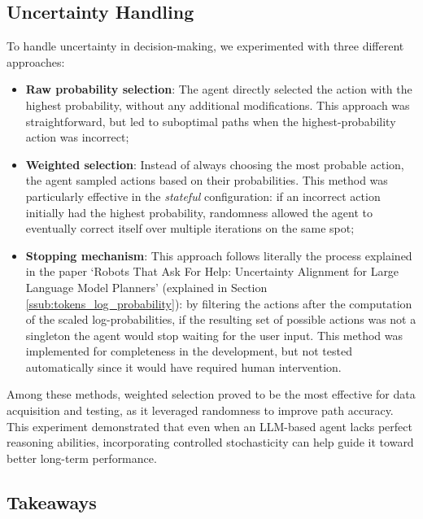 \subsection{Uncertainty Handling}
\label{sub:uncertainty_handling} To handle uncertainty in decision-making, we
experimented with three different approaches:
\begin{itemize}
  \item \textbf{Raw probability selection}: The agent directly selected the action
    with the highest probability, without any additional modifications. This approach
    was straightforward, but led to suboptimal paths when the highest-probability
    action was incorrect;

  \item \textbf{Weighted selection}: Instead of always choosing the most probable
    action, the agent sampled actions based on their probabilities. This method was
    particularly effective in the \emph{stateful} configuration: if an incorrect
    action initially had the highest probability, randomness allowed the agent
    to eventually correct itself over multiple iterations on the same spot;

  \item \textbf{Stopping mechanism}: This approach follows literally the process
    explained in the paper `Robots That Ask For Help: Uncertainty Alignment for Large
    Language Model Planners' (explained in Section \ref{ssub:tokens_log_probability}):
    by filtering the actions after the computation of the scaled log-probabilities,
    if the resulting set of possible actions was not a singleton the agent would
    stop waiting for the user input. This method was implemented for completeness
    in the development, but not tested automatically since it would have
    required human intervention.
\end{itemize}
Among these methods, weighted selection proved to be the most effective for data
acquisition and testing, as it leveraged randomness to improve path accuracy.
This experiment demonstrated that even when an LLM-based agent lacks perfect
reasoning abilities, incorporating controlled stochasticity can help guide it toward
better long-term performance.

\subsection{Takeaways}

